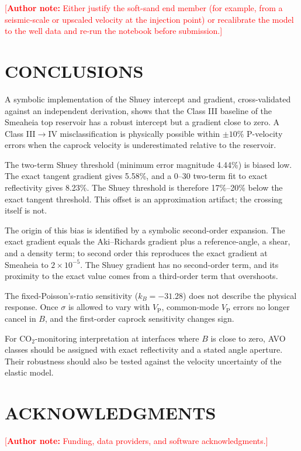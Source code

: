 \documentclass[11pt]{article}
\newcommand{\authornote}[1]{\textcolor{red}{[\textbf{Author note:} #1]}}
\newcommand{\VP}{V_\mathrm{P}}
\begin{document}
\authornote{Either justify the soft-sand end member (for example, from a seismic-scale or upscaled velocity at the injection point) or recalibrate the model to the well data and re-run the notebook before submission.}

\section*{CONCLUSIONS}

A symbolic implementation of the Shuey intercept and gradient, cross-validated against an independent derivation, shows that the Class III baseline of the Smeaheia top reservoir has a robust intercept but a gradient close to zero. A Class III$\to$IV misclassification is physically possible within $\pm10\%$ P-velocity errors when the caprock velocity is underestimated relative to the reservoir.

The two-term Shuey threshold (minimum error magnitude 4.44\%) is biased low. The exact tangent gradient gives 5.58\%, and a 0\textdegree--30\textdegree{} two-term fit to exact reflectivity gives 8.23\%. The Shuey threshold is therefore 17\%--20\% below the exact tangent threshold. This offset is an approximation artifact; the crossing itself is not.

The origin of this bias is identified by a symbolic second-order expansion. The exact gradient equals the Aki--Richards gradient plus a reference-angle, a shear, and a density term; to second order this reproduces the exact gradient at Smeaheia to $2\times10^{-5}$. The Shuey gradient has no second-order term, and its proximity to the exact value comes from a third-order term that overshoots.

The fixed-Poisson's-ratio sensitivity ($k_B=-31.28$) does not describe the physical response. Once $\sigma$ is allowed to vary with $\VP$, common-mode $\VP$ errors no longer cancel in $B$, and the first-order caprock sensitivity changes sign.

For CO$_2$-monitoring interpretation at interfaces where $B$ is close to zero, AVO classes should be assigned with exact reflectivity and a stated angle aperture. Their robustness should also be tested against the velocity uncertainty of the elastic model.

\section*{ACKNOWLEDGMENTS}
\authornote{Funding, data providers, and software acknowledgments.}
\end{document}
